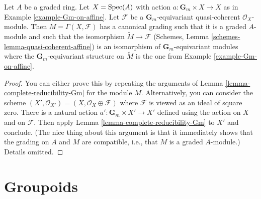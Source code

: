 \begin{lemma}
\label{lemma-Gm-equivariant-module}
Let $A$ be a graded ring. Let $X = \mathop{\mathrm{Spec}}(A)$ with action
$a : \mathbf{G}_m \times X \to X$ as in Example \ref{example-Gm-on-affine}.
Let $\mathcal{F}$ be a $\mathbf{G}_m$-equivariant quasi-coherent
$\mathcal{O}_X$-module. Then $M = \Gamma(X, \mathcal{F})$
has a canonical grading such that it is a graded $A$-module
and such that the isomorphism $\widetilde{M} \to \mathcal{F}$
(Schemes, Lemma \ref{schemes-lemma-quasi-coherent-affine})
is an isomorphism of $\mathbf{G}_m$-equivariant modules where
the $\mathbf{G}_m$-equivariant structure on $\widetilde{M}$
is the one from Example \ref{example-Gm-on-affine}.
\end{lemma}

\begin{proof}
You can either prove this by repeating the arguments of
Lemma \ref{lemma-complete-reducibility-Gm} for the module $M$.
Alternatively, you can consider the scheme
$(X', \mathcal{O}_{X'}) = (X, \mathcal{O}_X \oplus \mathcal{F})$
where $\mathcal{F}$ is viewed as an ideal of square zero.
There is a natural action $a' : \mathbf{G}_m \times X' \to X'$
defined using the action on $X$ and on $\mathcal{F}$. Then apply
Lemma \ref{lemma-complete-reducibility-Gm} to $X'$ and conclude.
(The nice thing about this argument is that it immediately shows
that the grading on $A$ and $M$ are compatible, i.e., that $M$
is a graded $A$-module.)
Details omitted.
\end{proof}



\section{Groupoids}
\label{section-groupoids}

